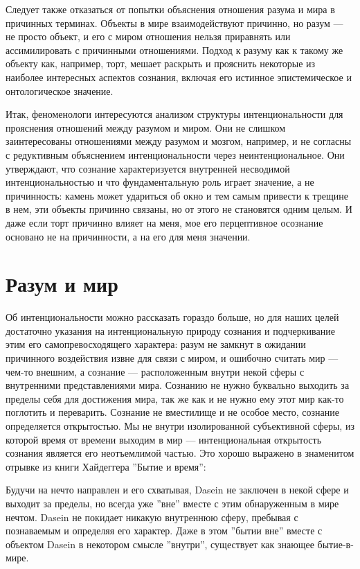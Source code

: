 \documentclass[11pt]{book}
\begin{document}
Следует также отказаться от попытки объяснения отношения разума и мира в причинных терминах. Объекты в мире взаимодействуют причинно, но разум --- не просто объект, и его с миром отношения нельзя приравнять или ассимилировать с причинными отношениями. Подход к разуму как к такому же объекту как, например, торт, мешает раскрыть и прояснить некоторые из наиболее интересных аспектов сознания, включая его истинное эпистемическое и онтологическое значение.

Итак, феноменологи интересуются анализом структуры интенциональности для прояснения отношений между разумом и миром. Они не слишком заинтересованы отношениями между разумом и мозгом, например, и не согласны с редуктивным объяснением интенциональности через неинтенциональное. Они утверждают, что сознание характеризуется внутренней несводимой интенциональностью и что фундаментальную роль играет значение, а не причинность: камень может удариться об окно и тем самым привести к трещине в нем, эти объекты причинно связаны, но от этого не становятся одним целым. И даже если торт причинно влияет на меня, мое его перцептивное осознание основано не на причинности, а на его для меня значении.

\section{Разум и мир}

Об интенциональности можно рассказать гораздо больше, но для наших целей достаточно указания на интенциональную природу сознания и подчеркивание этим его самопревосходящего характера: разум не замкнут в ожидании причинного воздействия извне для связи с миром, и ошибочно считать мир --- чем-то внешним, а сознание --- расположенным внутри некой сферы с внутренними представлениями мира. Сознанию не нужно буквально выходить за пределы себя для достижения мира, так же как и не нужно ему этот мир как-то поглотить и переварить. Сознание не вместилище и не особое место, сознание определяется открытостью. Мы не внутри изолированной субъективной сферы, из которой время от времени выходим в мир --- интенциональная открытость сознания является его неотъемлимой частью. Это хорошо выражено в знаменитом отрывке из книги Хайдеггера ''Бытие и время'':

\smallskip
{}\relax
{}\relax

Будучи на нечто направлен и его схватывая, Dasein не заключен в некой сфере и выходит за пределы, но всегда уже ''вне'' вместе с этим обнаруженным в мире нечтом. Dasein не покидает никакую внутреннюю сферу, пребывая с познаваемым и определяя его характер. Даже в этом ''бытии вне'' вместе с объектом Dasein в некотором смысле ''внутри'', существует как знающее бытие-в-мире.
\end{document}
